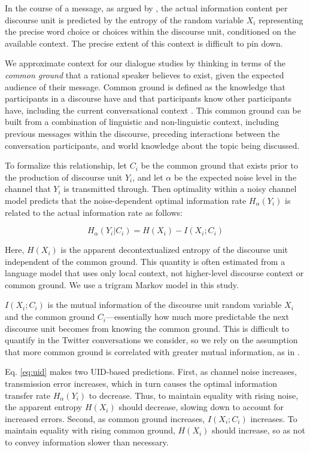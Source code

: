 \documentclass[11pt,letterpaper]{article}
\begin{document}
In the course of a message, as argued by , the actual information content per discourse unit is predicted by the entropy of the random variable $X_i$ representing the precise word choice or choices within the discourse unit, conditioned on the available context.  The precise extent of this context is difficult to pin down. 

We approximate context for our dialogue studies by thinking in terms of the {\it common ground} that a rational speaker believes to exist, given the expected audience of their message. Common ground is defined as the knowledge that participants in a discourse have and that participants know other participants have, including the current conversational context \cite{clark1996}. This common ground can be built from a combination of linguistic and non-linguistic context, including previous messages within the discourse, preceding interactions between the conversation participants, and world knowledge about the topic being discussed.

To formalize this relationship, let $C_i$ be the common ground that exists prior to the production of discourse unit $Y_i$, and let $\alpha$ be the expected noise level in the channel that $Y_i$ is transmitted through.  Then optimality within a noisy channel model predicts that the noise-dependent optimal information rate $H_{\alpha}(Y_i)$ is related to the actual information rate as follows:

\begin{equation}
H_{\alpha}(Y_i|C_i) =  H(X_i) - I(X_i ; C_i) \label{eq:uid}
\end{equation}

Here, $H(X_i)$ is the apparent decontextualized entropy of the discourse unit independent of the common ground.  This quantity is often estimated from a language model that uses only local context, not higher-level discourse context or common ground.  We use a trigram Markov model in this study.

$I(X_i;C_i)$ is the mutual information of the discourse unit random variable $X_i$ and the common ground $C_i$---essentially how much more predictable the next discourse unit becomes from knowing the common ground.  This is difficult to quantify in the Twitter conversations we consider, so we rely on the assumption that more common ground is correlated with greater mutual information, as in .

Eq. \ref{eq:uid} makes two UID-based predictions. First, as channel noise increases, transmission error increases, which in turn causes the optimal information transfer rate $H_\alpha(Y_i)$ to decrease.  Thus, to maintain equality with rising noise, the apparent entropy $H(X_i)$ should decrease, slowing down to account for increased errors.  Second, as common ground increases, $I(X_i;C_i)$ increases. To maintain equality with rising common ground, $H(X_i)$ should increase, so as not to convey information slower than necessary.
\end{document}
